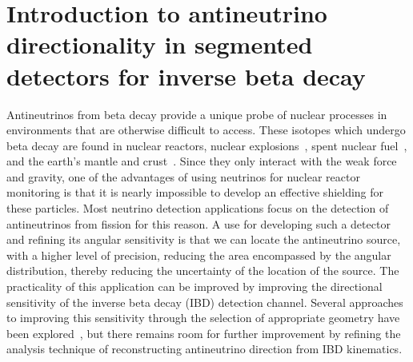 \documentclass[tightenlines,twocolumn,prl,notitlepage,nofootinbib,preprintnumbers,longbibliography]{revtex4-1}
\begin{document}
\section{Introduction to antineutrino directionality in segmented detectors for inverse beta decay}
Antineutrinos from beta decay provide a unique probe of nuclear processes in environments that are otherwise difficult to access.  
These isotopes which undergo beta decay are found in nuclear reactors, nuclear explosions~\cite{Bernstein:2009ab, Foxe:2020vtb, 10.1063/5.0263319}, spent nuclear fuel~\cite{PhysRevApplied.8.054050,Radermacher:2022pnt, doublechoozcollaboration2025measurementneutrinoemissionsspent}, and the earth's mantle and crust~\cite{Watanabe:2014, Leyton:2017tza}. 
Since they only interact with the weak force and gravity, one of the advantages of using neutrinos for nuclear reactor monitoring is that it is nearly impossible to develop an effective shielding for these particles. 
Most neutrino detection applications focus on the detection of antineutrinos from fission for this reason. 
A use for developing such a detector and refining its angular sensitivity is that we can locate the antineutrino source, with a higher level of precision, reducing the area encompassed by the angular distribution, thereby reducing the uncertainty of the location of the source. The practicality of this application can be improved by improving the directional sensitivity of the inverse beta decay (IBD) detection channel. Several approaches to improving this sensitivity through the selection of appropriate geometry have been explored~\cite{Duvall:2024cae}, but there remains room for further improvement by refining the analysis technique of reconstructing antineutrino direction from IBD kinematics. 
\end{document}
